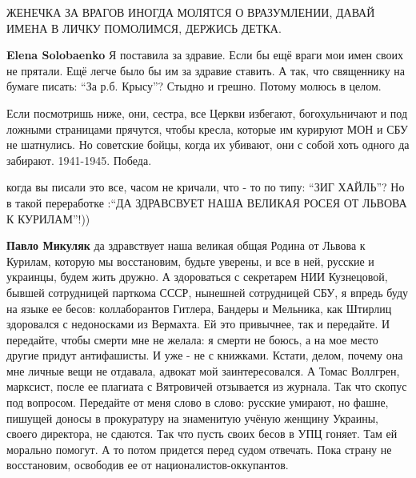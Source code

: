 \begin{itemize}
\begin{itemize}
\end{itemize}

ЖЕНЕЧКА ЗА ВРАГОВ ИНОГДА МОЛЯТСЯ О ВРАЗУМЛЕНИИ, ДАВАЙ ИМЕНА В ЛИЧКУ ПОМОЛИМСЯ, ДЕРЖИСЬ ДЕТКА.


\begin{itemize}
\textbf{Elena Solobaenko} Я поставила за здравие. Если бы ещё враги мои имен
своих не прятали. Ещё легче было бы им за здравие ставить. А так, что
священнику на бумаге писать: \enquote{За р.б. Крысу}? Стыдно и грешно. Потому молюсь в
целом.


Если посмотришь ниже, они, сестра, все Церкви избегают, богохульничают и под
ложными страницами прячутся, чтобы кресла, которые им курируют МОН и СБУ не
шатнулись. Но советские бойцы, когда их убивают, они с собой хоть одного да
забирают. 1941-1945. Победа.

\end{itemize}


когда вы писали это все, часом не кричали, что - то по типу: \enquote{ЗИГ ХАЙЛЬ}? Но в
такой переработке :\enquote{ДА ЗДРАВСВУЕТ НАША ВЕЛИКАЯ РОСЕЯ ОТ ЛЬВОВА К КУРИЛАМ}!))

\begin{itemize}
\textbf{Павло Микуляк} да здравствует наша великая общая Родина от Львова к
Курилам, которую мы восстановим, будьте уверены, и все в ней, русские и
украинцы, будем жить дружно. А здороваться с секретарем НИИ Кузнецовой, бывшей
сотрудницей парткома СССР, нынешней сотрудницей СБУ, я впредь буду на языке ее
бесов: коллаборантов Гитлера, Бандеры и Мельника, как Штирлиц здоровался с
недоносками из Вермахта. Ей это привычнее, так и передайте. И передайте, чтобы
смерти мне не желала: я смерти не боюсь, а на мое место другие придут
антифашисты. И уже - не с книжками. Кстати, делом, почему она мне личные вещи
не отдавала, адвокат мой заинтересовался. А Томас Воллгрен, марксист, после ее
плагиата с Вятровичей отзывается из журнала. Так что скопус под вопросом.
Передайте от меня слово в слово: русские умирают, но фашне, пишущей доносы в
прокуратуру на знаменитую учёную женщину Украины, своего директора, не сдаются.
Так что пусть своих бесов в УПЦ гоняет. Там ей морально помогут. А то потом
придется перед судом отвечать. Пока страну не восстановим, освободив ее от
националистов-оккупантов.


\end{itemize}
\end{itemize}
